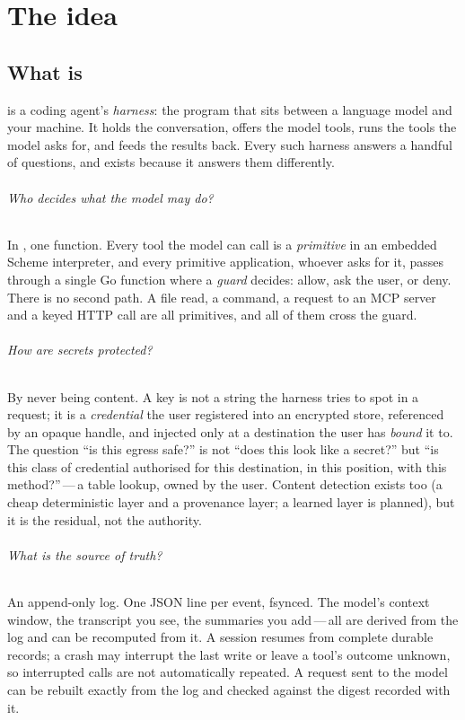\part{The idea}

\chapter{What \nodwyn{} is}

\nodwyn{} is a coding agent's \emph{harness}: the program that sits between a
language model and your machine. It holds the conversation, offers the model
tools, runs the tools the model asks for, and feeds the results back. Every
such harness answers a handful of questions, and \nodwyn{} exists because it
answers them differently.

\paragraph{Who decides what the model may do?} In \nodwyn{}, one function. Every
tool the model can call is a \emph{primitive} in an embedded Scheme
interpreter, and every primitive application, whoever asks for it, passes
through a single Go function where a \emph{guard} decides: allow, ask the
user, or deny. There is no second path. A file read, a command, a request to
an MCP server and a keyed HTTP call are all primitives, and all of them
cross the guard.

\paragraph{How are secrets protected?} By never being content. A key is not
a string the harness tries to spot in a request; it is a \emph{credential}
the user registered into an encrypted store, referenced by an opaque handle,
and injected only at a destination the user has \emph{bound} it to. The
question ``is this egress safe?'' is not ``does this look like a secret?''
but ``is this class of credential authorised for this destination, in this
position, with this method?''\,---\,a table lookup, owned by the user. Content
detection exists too (a cheap deterministic layer and a provenance layer;
a learned layer is planned), but it is the residual, not the authority.

\paragraph{What is the source of truth?} An append-only log. One JSON line
per event, fsynced. The model's context window, the transcript you see, the
summaries you add\,---\,all are derived from the log and can be recomputed
from it. A session resumes from complete durable records; a crash may interrupt
the last write or leave a tool's outcome unknown, so interrupted calls are not
automatically repeated. A
request sent to the model can be rebuilt exactly from the log and checked
against the digest recorded with it.

